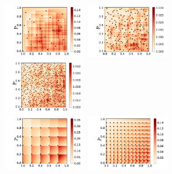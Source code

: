 \documentclass[twoside,11pt]{book}
\newtheorem{definition}{Definition}
\begin{document}




\begin{figure}
\centering
\includegraphics[width= 0.32\textwidth]{img/discrepancy/local_discrepancy_halton_N_25.pdf}~\includegraphics[width= 0.32\textwidth]{img/discrepancy/local_discrepancy_halton_N_144.pdf}
~\includegraphics[width= 0.32\textwidth]{img/discrepancy/local_discrepancy_halton_N_400.pdf}\\
\includegraphics[width= 0.32\textwidth]{img/discrepancy/local_discrepancy_uniform_grid_N_25.pdf}~\includegraphics[width= 0.32\textwidth]{img/discrepancy/local_discrepancy_uniform_grid_N_144.pdf}

\end{figure}
\end{document}
